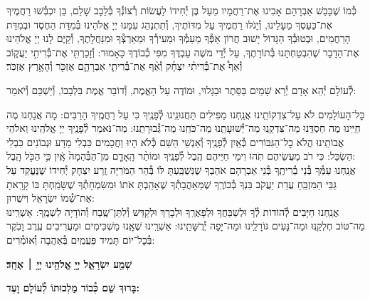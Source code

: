 \documentclass[twoside, openany, parskip=half, 11pt]{book}
\begin{document}
כְּ֯מוֹ שֶׁכָּבַשׁ אַבְרָהָם אָבִינוּ אֶת־רַחֲמָיו מֵעַל בֶּן יְ֯חִידוֹ לַעֲשׂוֹת רְ֯צוֹנְ֯ךָ בְּ֯לֵבָב שָׁלֵם, כֵּן יִכְבְּ֯שׁוּ רַחֲמֶיךָ אֶת־כַּעַסְךָ מֵעָלֵינוּ, וְ֯יָגֹלּוּ רַחֲמֶיךָ עַל מִדּוֹתֶיךָ, וְ֯תִתְנַהֵג עִמָּנוּ יְיָ אֱלֹהֵינוּ בְּ֯מִדַּת הַחֶסֶד וּבְמִדַּת הָרַחֲמִים, וּבְטוּבְ֯ךָ הַגָּדוֹל יָשׁוּב חֲרוֹן אַפְּ֯ךָ מֵעַמְּ֯ךָ וּמֵעִירְ֯ךָ וּמֵאַרְצְ֯ךָ וּמִנַּחֲלָתֶךָ, וְ֯קַיֶּם לָנוּ יְיָ אֱלֹהֵינוּ אֶת־הַדָּבָר שֶׁהִבְטַחְתָּנוּ בְּ֯תוֹרָתֶךָ, עַל יְ֯דֵי משֶׁה עַבְדֶּךָ מִפִּי כְ֯בוֹדֶךָ כָּאָמוּר: וְ֯זָכַרְתִּ֖י אֶת־בְּ֯רִיתִ֣י יַעֲק֑וֹב וְ֯אַף֩ אֶת־בְּ֯רִיתִ֨י יִצְחָ֜ק וְ֯אַ֨ף אֶת־בְּ֯רִיתִ֧י אַבְרָהָ֛ם אֶזְכֹּ֖ר וְ֯הָאָ֥רֶץ אֶזְכֹּֽר׃

\begin{small}
לְ֯עוֹלָם יְ֯הֵא אָדָם יְ֯רֵא שָׁמַיִם בַּסֵּתֶר וּבַגָּלוּי, וּמוֹדֶה עַל הָאֱמֶת, וְ֯דוֹבֵר אֱמֶת בִּלְבָבוֹ, וְ֯יַשְׁכֵּם וְ֯יֹאמַר:
\end{small}
כׇּל־הָעוֹלָמִים לֹא עַל־צִדְקוֹתֵֽינוּ אֲנַֽחְנוּ מַפִּילִים תַּחֲנוּנֵֽינוּ לְ֯פָנֶֽיךָ כִּי עַל רַחֲמֶֽיךָ הָרַבִּים: מָה אֲנַחְנוּ מֶה חַיֵּֽינוּ מֶה חַסְדֵּֽנוּ מַה־צִּדְקֵֽנוּ מַה־יְּ֯שׁוּעָתֵֽנוּ מַה־כֹּחֵֽנוּ מַה־גְּ֯בוּרָתֵֽנוּ: מַה־נֹּאמַר לְ֯פָנֶֽיךָ יְיָ אֱלֹהֵֽינוּ וֵאלֹהֵי אֲבוֹתֵֽינוּ הֲלֹא כׇל־הַגִּבּוֹרִים כְּ֯אַֽיִן לְ֯פָנֶֽיךָ וְ֯אַנְשֵׁי הַשֵּׁם כְּ֯לֹא הָיוּ וַחֲכָמִים כִּבְלִי מַדָּע וּנְבוֹנִים כִּבְלִי הַשְׂכֵּל: כִּי רֹב מַעֲשֵׂיהֶם תֹּֽהוּ וִימֵי חַיֵּיהֶם הֶֽבֶל לְ֯פָנֶֽיךָ וּמוֹתַ֨ר הָֽאָדָ֤ם מִן־הַבְּ֯הֵמָה֙ אָֽ֔יִן כִּ֥י הַכֹּ֖ל הָֽבֶל: \\
אֲנַֽחְנוּ עַמְּ֯ךָ בְּ֯נֵי בְ֯רִיתֶֽךָ בְּ֯נֵי אַבְרָהָם אֹהַבְךָ שֶׁנִּשְׁבַּֽעְתָּ לּוֹ בְּ֯הַר הַמֹּרִיָּה זֶֽרַע יִצְחָק יְ֯חִידוֹ שֶׁנֶּעֱקַד עַל גַּבֵּי הַמִּזְבֵּֽחַ עֲדַת יַעֲקֹב בִּנְךָ בְּ֯כוֹרֶֽךָ שֶׁמֵּאַהֲבָתְ֯ךָ שֶׁאָהַֽבְתָּ אֹתוֹ וּמִשִּׂמְחָתְ֯ךָ שֶׁשָּׂמַֽחְתָּ בּוֹ קָרָֽאתָ אֶת־שְׁ֯מוֹ יִשְׂרָאֵל וִישֻׁרוּן: \\
אֲנַֽחְנוּ חַיָּבִים לְ֯הוֹדוֹת לְ֯ךָ וּלְשַׁבֵּחֲךָ וּלְפָאֶרְֽךָ וּלְבָרֵךְ וּלְקַדֵּשׁ וְ֯לִתֵּן־שֶֽׁבַח וְ֯הוֹדָיָה לִשְׁמֶֽךָ: אַשְׁרֵֽינוּ מַה־טּוֹב חֶלְקֵֽנוּ וּמַה־נָּעִים גּוֹרָלֵֽינוּ וּמַה־יָּפָה יְ֯רֻשָּׁתֵֽינוּ: אַשְׁרֵֽינוּ שֶׁאָֽנוּ מַשְׁכִּימִים וּמַעֲרִיבִים עֶֽרֶב וָבֹֽקֶר בְּ֯כׇל־יוֹם תָּמִיד פַּעֲמַֽיִם בְּ֯אַהֲבָה וְ֯אוֹמְ֯רִים:

\begin{Large}
\textbf{שְׁמַ֖ע יִשְׂרָאֵ֑ל יְיָ֥ אֱלֹהֵ֖ינוּ יְיָ֥ ׀ אֶחָֽד׃}
\end{Large}

\textbf{%
בָּרוּךְ שֵׁם כְּ֯בוֹד מַלְכוּתוֹ לְ֯עוֹלָם וָעֶד:
}
\end{document}
